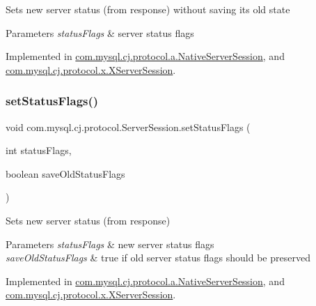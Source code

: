 Sets new server status (from response) without saving it\textquotesingle{}s old state


\begin{DoxyParams}{Parameters}
{\em status\+Flags} & server status flags \\
\hline
\end{DoxyParams}


Implemented in \mbox{\hyperlink{classcom_1_1mysql_1_1cj_1_1protocol_1_1a_1_1_native_server_session_ad533b5d433cde1b38176e2718308c7a4}{com.\+mysql.\+cj.\+protocol.\+a.\+Native\+Server\+Session}}, and \mbox{\hyperlink{classcom_1_1mysql_1_1cj_1_1protocol_1_1x_1_1_x_server_session_a30539eae0f7311ac3cd5c9f44c8f7585}{com.\+mysql.\+cj.\+protocol.\+x.\+X\+Server\+Session}}.

\mbox{\label{interfacecom_1_1mysql_1_1cj_1_1protocol_1_1_server_session_acf86f0ae9cdfd88f758ec42bb72bf127}} 
\subsubsection{\texorpdfstring{set\+Status\+Flags()}{setStatusFlags()}\hspace{0.1cm}{\footnotesize\ttfamily [2/2]}}
{\footnotesize\ttfamily void com.\+mysql.\+cj.\+protocol.\+Server\+Session.\+set\+Status\+Flags (\begin{DoxyParamCaption}\item[{int}]{status\+Flags,  }\item[{boolean}]{save\+Old\+Status\+Flags }\end{DoxyParamCaption})}

Sets new server status (from response)


\begin{DoxyParams}{Parameters}
{\em status\+Flags} & new server status flags \\
\hline
{\em save\+Old\+Status\+Flags} & true if old server status flags should be preserved \\
\hline
\end{DoxyParams}


Implemented in \mbox{\hyperlink{classcom_1_1mysql_1_1cj_1_1protocol_1_1a_1_1_native_server_session_a22280140ed155d3eedb9ab2c9c636afe}{com.\+mysql.\+cj.\+protocol.\+a.\+Native\+Server\+Session}}, and \mbox{\hyperlink{classcom_1_1mysql_1_1cj_1_1protocol_1_1x_1_1_x_server_session_a6b21c9c5c8446643ae85e58c3fe97af8}{com.\+mysql.\+cj.\+protocol.\+x.\+X\+Server\+Session}}.



